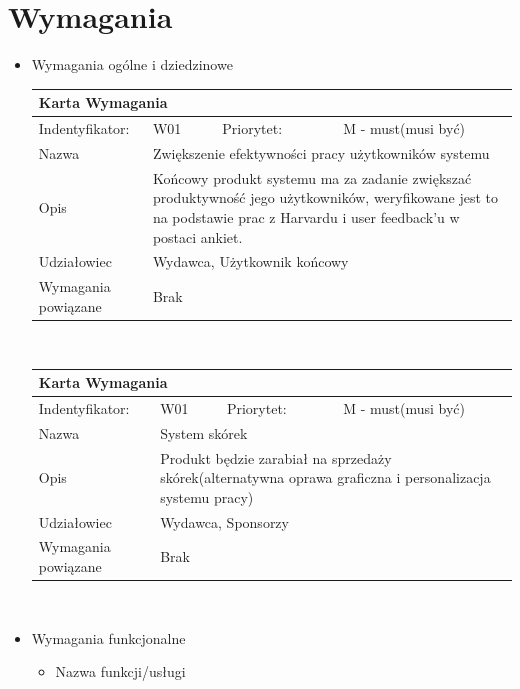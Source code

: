 \documentclass[a4paper,11pt]{report}
\begin{document}
\section{Wymagania}
\begin{itemize}
	\item Wymagania ogólne i dziedzinowe\\
		\begin{tabular}{|p{3cm}|p{2cm}|p{2cm}|p{6cm}|}
		\hline
		\multicolumn{4}{|p{12 cm}|}{Karta Wymagania}\\
		\hline
		Indentyfikator: & W01 & Priorytet: & M - must(musi być)\\
		\hline
		Nazwa & \multicolumn{3}{|p{10 cm}|}{Zwiększenie efektywności pracy użytkowników systemu}\\
		\hline
		Opis & \multicolumn{3}{|p{10 cm}|}{Końcowy produkt systemu ma za zadanie zwiększać produktywność jego użytkowników, weryfikowane jest to na podstawie prac z Harvardu i user feedback’u w postaci ankiet. }\\
		\hline
		Udziałowiec & \multicolumn{3}{|p{10 cm}|}{Wydawca, Użytkownik końcowy}\\
		\hline
		Wymagania powiązane & \multicolumn{3}{|p{10 cm}|}{Brak}\\
		\hline
		\end{tabular}\\
		\begin{tabular}{|p{3cm}|p{2cm}|p{2cm}|p{6cm}|}
		\hline
		\multicolumn{4}{|p{12 cm}|}{Karta Wymagania}\\
		\hline
		Indentyfikator: & W01 & Priorytet: & M - must(musi być)\\
		\hline
		Nazwa & \multicolumn{3}{|p{10 cm}|}{System skórek}\\
		\hline
		Opis & \multicolumn{3}{|p{10 cm}|}{Produkt będzie zarabiał na sprzedaży skórek(alternatywna oprawa graficzna i personalizacja systemu pracy)}\\
		\hline
		Udziałowiec & \multicolumn{3}{|p{10 cm}|}{Wydawca, Sponsorzy}\\
		\hline
		Wymagania powiązane & \multicolumn{3}{|p{10 cm}|}{Brak}\\
		\hline
		\end{tabular}\\
	\item Wymagania funkcjonalne
	\begin{itemize}
		\item Nazwa funkcji/usługi\\
		\begin{tabular}{|p{3cm}|p{2cm}|p{2cm}|p{6cm}|}

\end{tabular}
\end{itemize}
\end{itemize}
\end{document}
